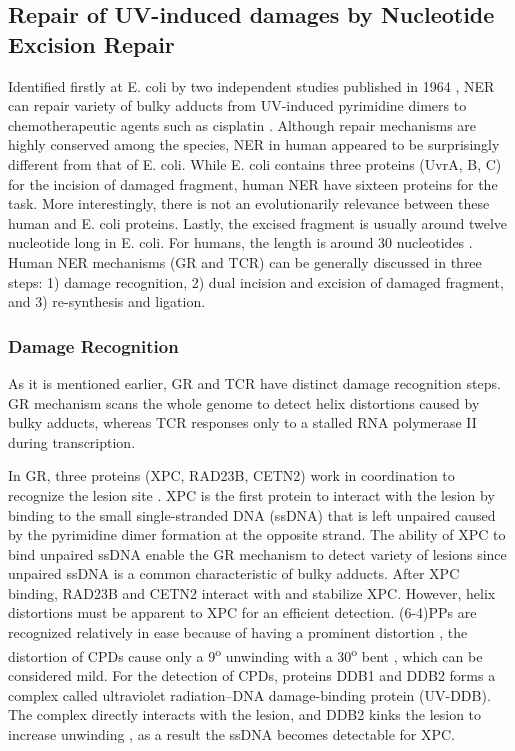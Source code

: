 \subsection{Repair of UV-induced damages by Nucleotide Excision Repair}

Identified firstly at E. coli by two independent studies published in 1964 \citep{boyce1964release,setlow1964disappearance}, NER can repair variety of bulky adducts from UV-induced pyrimidine dimers to chemotherapeutic agents such as cisplatin \citep{yimit2019differential}. Although repair mechanisms are highly conserved among the species, NER in human appeared to be surprisingly different from that of E. coli. While E. coli contains three proteins (UvrA, B, C) for the incision of damaged fragment, human NER have sixteen proteins for the task. More interestingly, there is not an evolutionarily relevance between these human and E. coli proteins. Lastly, the excised fragment is usually around twelve nucleotide long in E. coli. For humans, the length is around 30 nucleotides \citep{sancar2016mechanisms}. Human NER mechanisms (GR and TCR) can be generally discussed in three steps: 1) damage recognition, 2) dual incision and excision of damaged fragment, and 3) re-synthesis and ligation.  

\subsubsection{Damage Recognition}

As it is mentioned earlier, GR and TCR have distinct damage recognition steps. GR mechanism scans the whole genome to detect helix distortions caused by bulky adducts, whereas TCR responses only to a stalled RNA polymerase II during transcription. 

In GR, three proteins (XPC, RAD23B, CETN2) work in coordination to recognize the lesion site \citep{sugasawa1998xeroderma}. XPC is the first protein to interact with the lesion by binding to the small single-stranded DNA (ssDNA) that is left unpaired caused by the pyrimidine dimer formation at the opposite strand. The ability of XPC to bind unpaired ssDNA enable the GR mechanism to detect variety of lesions since unpaired ssDNA is a common characteristic of bulky adducts. After XPC binding, RAD23B and CETN2 interact with and stabilize XPC. However, helix distortions must be apparent to XPC for an efficient detection. (6-4)PPs are recognized relatively in ease because of having a prominent distortion \citep{mizukoshi2001structural}, the distortion of CPDs cause only a 9\textsuperscript{o} unwinding with a 30\textsuperscript{o} bent \citep{park2002crystal}, which can be considered mild. For the detection of CPDs, proteins DDB1 and DDB2 forms a complex called ultraviolet radiation–DNA damage-binding protein (UV-DDB). The complex directly interacts with the lesion, and DDB2 kinks the lesion to increase unwinding \citep{scrima2008structural}, as a result the ssDNA becomes detectable for XPC. 

